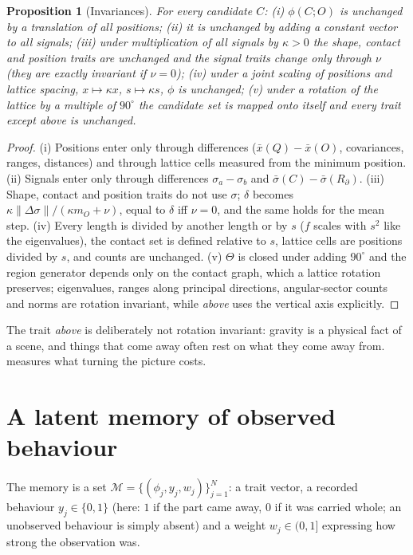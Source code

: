 \documentclass[10pt]{article}
\newtheorem{proposition}{Proposition}
\newcommand{\M}{\mathcal{M}}
\begin{document}
\begin{proposition}[Invariances]\label{prop:invariance}
For every candidate $C$: (i) $\phi(C;O)$ is unchanged by a translation of all positions; (ii) it is unchanged by adding a constant vector to all signals; (iii) under multiplication of all signals by $\kappa>0$ the shape, contact and position traits are unchanged and the signal traits change only through $\nu$ (they are exactly invariant if $\nu=0$); (iv) under a joint scaling of positions and lattice spacing, $x\mapsto\kappa x$, $s\mapsto\kappa s$, $\phi$ is unchanged; (v) under a rotation of the lattice by a multiple of $90^\circ$ the candidate set is mapped onto itself and every trait except \emph{above} is unchanged.
\end{proposition}
\begin{proof}
(i) Positions enter only through differences ($\bar x(Q)-\bar x(O)$, covariances, ranges, distances) and through lattice cells measured from the minimum position. (ii) Signals enter only through differences $\sigma_a-\sigma_b$ and $\bar\sigma(C)-\bar\sigma(R_\partial)$. (iii) Shape, contact and position traits do not use $\sigma$; $\delta$ becomes $\kappa\lVert\Delta\sigma\rVert/(\kappa m_O+\nu)$, equal to $\delta$ iff $\nu=0$, and the same holds for the mean step. (iv) Every length is divided by another length or by $s$ ($f$ scales with $s^2$ like the eigenvalues), the contact set is defined relative to $s$, lattice cells are positions divided by $s$, and counts are unchanged. (v) $\Theta$ is closed under adding $90^\circ$ and the region generator depends only on the contact graph, which a lattice rotation preserves; eigenvalues, ranges along principal directions, angular-sector counts and norms are rotation invariant, while \emph{above} uses the vertical axis explicitly.
\end{proof}
The trait \emph{above} is deliberately not rotation invariant: gravity is a physical fact of a scene, and things that come away often rest on what they come away from.  measures what turning the picture costs.

\section{A latent memory of observed behaviour}
\label{sec:memory}

The memory is a set $\M=\{(\phi_j,y_j,w_j)\}_{j=1}^{N}$: a trait vector, a recorded behaviour $y_j\in\{0,1\}$ (here: $1$ if the part came away, $0$ if it was carried whole; an unobserved behaviour is simply absent) and a weight $w_j\in(0,1]$ expressing how strong the observation was.
\end{document}
